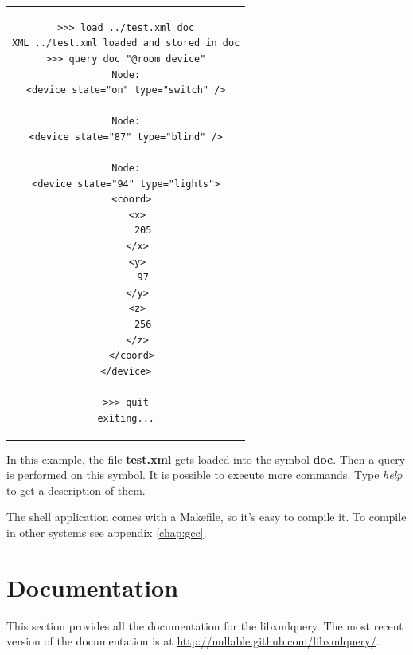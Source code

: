 \documentclass[a4paper]{report}
\begin{document}
\begin{center}
\lstset{language=bash,caption=Typical usage of the shell application. The banner was intentionally removed., captionpos=b}
\begin{tabular}{c}
\begin{lstlisting}
>>> load ../test.xml doc
XML ../test.xml loaded and stored in doc
>>> query doc "@room device"
Node:
<device state="on" type="switch" />

Node:
<device state="87" type="blind" />

Node:
<device state="94" type="lights">
  <coord>
    <x>
      205
    </x>
    <y>
      97
    </y>
    <z>
      256
    </z>
  </coord>
</device>

>>> quit
exiting...
\end{lstlisting}
\end{tabular}
\end{center}

		In this example, the file \textbf{test.xml} gets loaded into the symbol \textbf{doc}. Then a query is performed on this symbol. It is possible to execute more commands. Type \emph{help} to get a description of them.

		The shell application comes with a Makefile, so it's easy to compile it. To compile in other systems see appendix \ref{chap:gcc}.

\chapter{Documentation}\label{chap:doc}
	This section provides all the documentation for the libxmlquery. The most recent version of the documentation is at \url{http://nullable.github.com/libxmlquery/}.
\end{document}
